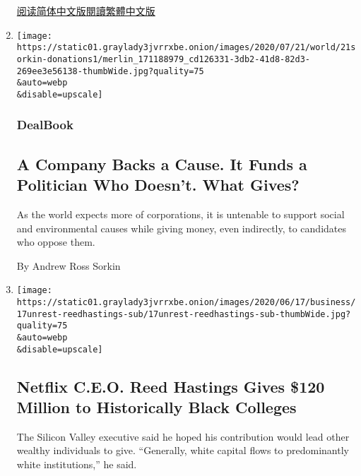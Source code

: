 \begin{enumerate}
  \href{https://cn.nytimes3xbfgragh.onion/technology/20200826/tiktoks-microsoft-deal-soap-opera-trump/}{阅读简体中文版}\href{https://cn.nytimes3xbfgragh.onion/technology/20200826/tiktoks-microsoft-deal-soap-opera-trump/zh-hant/}{閱讀繁體中文版}
\item
  \href{/2020/07/21/business/dealbook/corporate-political-donations.html}{}

  \texttt{[image: https://static01.graylady3jvrrxbe.onion/images/2020/07/21/world/21sorkin-donations1/merlin\_171188979\_cd126331-3db2-41d8-82d3-269ee3e56138-thumbWide.jpg?quality=75\\\&auto=webp\\\&disable=upscale]}

  \hypertarget{dealbook}{%
  \subsubsection{DealBook}\label{dealbook}}

  \hypertarget{a-company-backs-a-cause-it-funds-a-politician-who-doesnt-what-gives}{%
  \subsection{A Company Backs a Cause. It Funds a Politician Who
  Doesn't. What
  Gives?}\label{a-company-backs-a-cause-it-funds-a-politician-who-doesnt-what-gives}}

  As the world expects more of corporations, it is untenable to support
  social and environmental causes while giving money, even indirectly,
  to candidates who oppose them.

  By Andrew Ross Sorkin
\item
  \href{/2020/06/17/business/netflix-reed-hastings-hbcus.html}{}

  \texttt{[image: https://static01.graylady3jvrrxbe.onion/images/2020/06/17/business/17unrest-reedhastings-sub/17unrest-reedhastings-sub-thumbWide.jpg?quality=75\\\&auto=webp\\\&disable=upscale]}

  \hypertarget{netflix-ceo-reed-hastings-gives-120-million-to-historically-black-colleges}{%
  \subsection{Netflix C.E.O. Reed Hastings Gives \$120 Million to
  Historically Black
  Colleges}\label{netflix-ceo-reed-hastings-gives-120-million-to-historically-black-colleges}}

  The Silicon Valley executive said he hoped his contribution would lead
  other wealthy individuals to give. ``Generally, white capital flows to
  predominantly white institutions,'' he said.


\end{enumerate}
